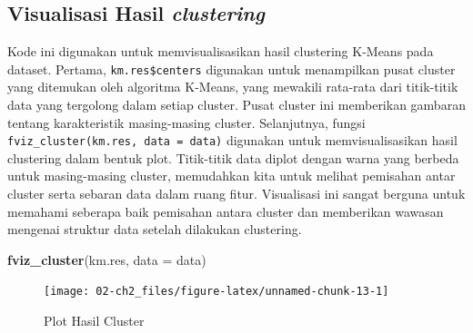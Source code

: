 \documentclass[
  oneside]{book}
\newenvironment{Shaded}{\begin{snugshade}}{\end{snugshade}}
\newcommand{\AttributeTok}[1]{\textcolor[rgb]{0.13,0.29,0.53}{#1}}
\newcommand{\CommentTok}[1]{\textcolor[rgb]{0.56,0.35,0.01}{\textit{#1}}}
\newcommand{\FunctionTok}[1]{\textcolor[rgb]{0.13,0.29,0.53}{\textbf{#1}}}
\newcommand{\NormalTok}[1]{#1}
\newcommand{\SpecialCharTok}[1]{\textcolor[rgb]{0.81,0.36,0.00}{\textbf{#1}}}
\begin{document}
\subsection*{\texorpdfstring{Visualisasi Hasil \emph{clustering}}{Visualisasi Hasil clustering}}\label{visualisasi-hasil-clustering}

Kode ini digunakan untuk memvisualisasikan hasil clustering K-Means pada dataset. Pertama, \texttt{km.res\$centers} digunakan untuk menampilkan pusat cluster yang ditemukan oleh algoritma K-Means, yang mewakili rata-rata dari titik-titik data yang tergolong dalam setiap cluster. Pusat cluster ini memberikan gambaran tentang karakteristik masing-masing cluster. Selanjutnya, fungsi \texttt{fviz\_cluster(km.res,\ data\ =\ data)} digunakan untuk memvisualisasikan hasil clustering dalam bentuk plot. Titik-titik data diplot dengan warna yang berbeda untuk masing-masing cluster, memudahkan kita untuk melihat pemisahan antar cluster serta sebaran data dalam ruang fitur. Visualisasi ini sangat berguna untuk memahami seberapa baik pemisahan antara cluster dan memberikan wawasan mengenai struktur data setelah dilakukan clustering.

\begin{Shaded}
\end{Shaded}

\begin{Shaded}
\begin{Highlighting}[]
\FunctionTok{fviz\_cluster}\NormalTok{(km.res, }\AttributeTok{data =}\NormalTok{ data)}
\end{Highlighting}
\end{Shaded}

\begin{figure}[h]

{\centering \texttt{[image: 02-ch2\_files/figure-latex/unnamed-chunk-13-1]} 

}

\caption{Plot Hasil Cluster}\label{fig:unnamed-chunk-13}
\end{figure}
\end{document}
